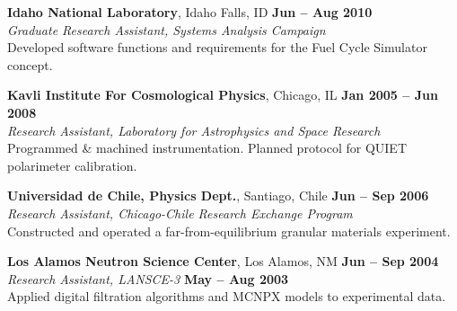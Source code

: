 \documentclass[margin,line]{resume}
\begin{document}
\begin{resume}
    \textbf{Idaho National Laboratory}, Idaho Falls, ID \hfill \textbf{Jun -- Aug 2010}\\
                \textsl{Graduate Research Assistant, Systems Analysis Campaign}\\
                Developed software functions and requirements for the Fuel Cycle Simulator concept.

    \textbf{Kavli Institute For Cosmological Physics}, Chicago, IL \hfill \textbf{Jan 2005 -- Jun 2008}\\
                \textsl{Research Assistant, Laboratory for Astrophysics and Space Research}\\
                Programmed \& machined instrumentation. Planned protocol for QUIET polarimeter calibration.

    \textbf{Universidad de Chile, Physics Dept.}, Santiago, Chile \hfill \textbf{Jun -- Sep 2006}\\
                \textsl{Research Assistant, Chicago-Chile Research Exchange Program}\\
                 Constructed and operated a far-from-equilibrium granular
                 materials experiment.

    \textbf{Los Alamos Neutron Science Center}, Los Alamos, NM \hfill \textbf{Jun -- Sep 2004}\\
                \textsl{Research Assistant, LANSCE-3} \hfill \textbf{May -- Aug 2003}\\
                Applied digital filtration algorithms and MCNPX models to experimental data.

\end{resume}
\end{document}
